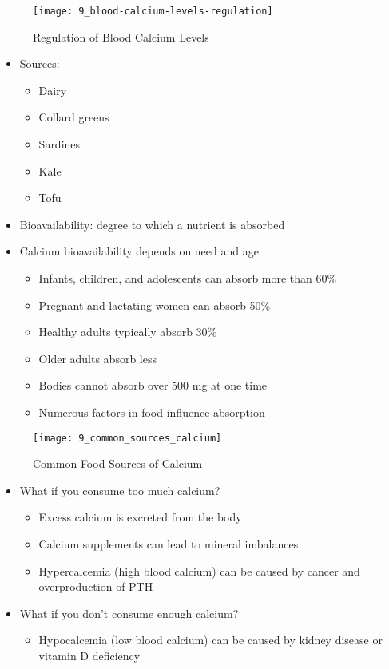 \documentclass[title={Chapter 9}]{fdsn201notes}
\begin{document}
\begin{figure}[H]
	\centering
	\texttt{[image: 9\_blood-calcium-levels-regulation]}
	\caption{Regulation of Blood Calcium Levels}
	\label{fig:regulation-of-blood-calcium-levels}
\end{figure}

\begin{itemize}
	\item Sources:
	\begin{itemize}
		\item Dairy
		\item Collard greens
		\item Sardines
		\item Kale
		\item Tofu
	\end{itemize}
	\item Bioavailability: degree to which a nutrient is absorbed
	\item Calcium bioavailability depends on need and age
	\begin{itemize}
		\item Infants, children, and adolescents can absorb more than 60\%
		\item Pregnant and lactating women can absorb 50\%
		\item Healthy adults typically absorb 30\%
		\item Older adults absorb less
		\item Bodies cannot absorb over 500 mg at one time
		\item Numerous factors in food influence absorption
	\end{itemize}
\end{itemize}

\begin{figure}[H]
	\centering
	\texttt{[image: 9\_common\_sources\_calcium]}
	\caption{Common Food Sources of Calcium}
	\label{fig:calcium-common-food-sources}
\end{figure}

\begin{itemize}
	\item What if you consume too much calcium?
	\begin{itemize}
		\item Excess calcium is excreted from the body
		\item Calcium supplements can lead to mineral imbalances
		\item Hypercalcemia (high blood calcium) can be caused by cancer and overproduction of PTH
	\end{itemize}
	\item What if you don’t consume enough calcium?
	\begin{itemize}
		\item Hypocalcemia (low blood calcium) can be caused by kidney disease or vitamin D deficiency
	\end{itemize}
\end{itemize}
\end{document}
